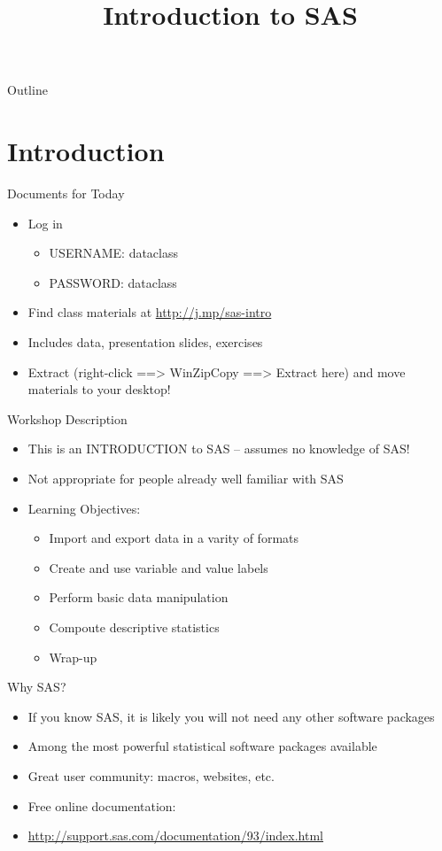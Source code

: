 \documentclass[table,smaller]{beamer}
\institute{Harvard MIT Data Center}
\author{}
\date{}
\title{Introduction to SAS}
\begin{document}
\maketitle
\begin{frame}{Outline}
\tableofcontents
\end{frame}



\section{Introduction}
\label{sec-1}

\begin{frame}[label=sec-1-1]{Documents for Today}
\begin{itemize}
\item Log in
\begin{itemize}
\item USERNAME: dataclass
\item PASSWORD: dataclass
\end{itemize}
\item Find class materials at \url{http://j.mp/sas-intro}
\item Includes data, presentation slides, exercises
\item Extract (right-click ==> WinZipCopy ==> Extract here) and move materials to your desktop!
\end{itemize}
\end{frame}
\begin{frame}[label=sec-1-2]{Workshop Description}
\begin{itemize}
\item This is an INTRODUCTION to SAS -- assumes no knowledge of SAS!
\item Not appropriate for people already well familiar with SAS
\item Learning Objectives:
\begin{itemize}
\item Import and export data in a varity of formats
\item Create and use variable and value labels
\item Perform basic data manipulation
\item Compoute descriptive statistics
\item Wrap-up
\end{itemize}
\end{itemize}
\end{frame}
\begin{frame}[label=sec-1-3]{Why SAS?}
\begin{itemize}
\item If you know SAS, it is likely you will not need any other software packages
\item Among the most powerful statistical software packages available
\item Great user community: macros, websites, etc.
\item Free online documentation:
\item \url{http://support.sas.com/documentation/93/index.html}
\end{itemize}
\end{frame}
\end{document}
